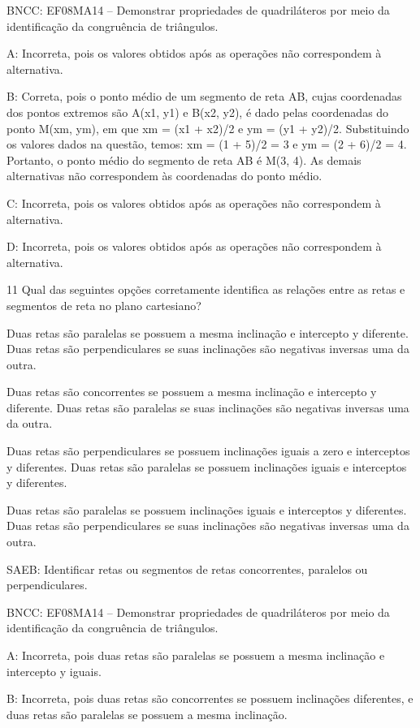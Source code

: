 {BNCC: EF08MA14 -- Demonstrar propriedades de quadriláteros por meio da
identificação da congruência de triângulos.

A: Incorreta, pois os valores obtidos após as operações não correspondem
à alternativa.

B: Correta, pois o ponto médio de um segmento de reta AB, cujas
coordenadas dos pontos extremos são A(x1, y1) e B(x2, y2), é dado pelas
coordenadas do ponto M(xm, ym), em que xm = (x1 + x2)/2 e ym = (y1 +
y2)/2. Substituindo os valores dados na questão, temos: xm = (1 + 5)/2 =
3 e ym = (2 + 6)/2 = 4. Portanto, o ponto médio do segmento de reta AB é
M(3, 4). As demais alternativas não correspondem às coordenadas do ponto
médio.

C: Incorreta, pois os valores obtidos após as operações não correspondem
à alternativa.

D: Incorreta, pois os valores obtidos após as operações não correspondem
à alternativa.

\num{11} Qual das seguintes opções corretamente identifica as relações entre
as retas e segmentos de reta no plano cartesiano?
\item Duas retas são paralelas se possuem a mesma inclinação e intercepto y
diferente. Duas retas são perpendiculares se suas inclinações são
negativas inversas uma da outra.
\item Duas retas são concorrentes se possuem a mesma inclinação e
intercepto y diferente. Duas retas são paralelas se suas inclinações são
negativas inversas uma da outra.
\item Duas retas são perpendiculares se possuem inclinações iguais a zero e
interceptos y diferentes. Duas retas são paralelas se possuem
inclinações iguais e interceptos y diferentes.
\item Duas retas são paralelas se possuem inclinações iguais e interceptos
y diferentes. Duas retas são perpendiculares se suas inclinações são
negativas inversas uma da outra.

SAEB: Identificar retas ou segmentos de retas concorrentes, paralelos ou
perpendiculares.

BNCC: EF08MA14 -- Demonstrar propriedades de quadriláteros por meio da
identificação da congruência de triângulos.

A: Incorreta, pois duas retas são paralelas se possuem a mesma
inclinação e intercepto y iguais.

B: Incorreta, pois duas retas são concorrentes se possuem inclinações
diferentes, e duas retas são paralelas se possuem a mesma inclinação.

}
